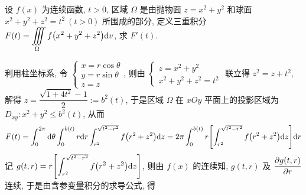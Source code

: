 \begin{example}
    设 $f(x)$ 为连续函数, $t>0$, 区域 $\Omega$ 是由抛物面 $z=x^2+y^2$ 和球面 $x^2+y^2+z^2=t^2~ (t>0)$ 所围成的部分, 定义三重积分 $\displaystyle F(t)=\iiint\limits_{\Omega}f\qty(x^2+y^2+z^2)\dd v$, 求 $F'(t).$
\end{example}
\begin{solution}
    利用柱坐标系, 令 $\begin{cases}
            x=r\cos\theta \\ y=r\sin\theta\\ z=z
        \end{cases}$, 则由 $\begin{cases}
            z=x^2+y^2 \\ x^2+y^2+z^2=t^2
        \end{cases}$ 联立得 $z^2=z+t^2$, 解得 $z=\dfrac{\sqrt{1+4t^2}-1}{2}:=b^2(t)$,
    于是区域 $\Omega$ 在 $xOy$ 平面上的投影区域为 $D_{xy}:x^2+y^2\leqslant b^2(t)$, 从而
    $$F(t)=\int_{0}^{2\pi}\dd \theta\int_{0}^{b(t)}r\dd r\int_{r^2}^{\sqrt{t^2-r^2}}f\qty(r^2+z^2)\dd z=2\pi\int_{0}^{b(t)}r\qty[\int_{r^2}^{\sqrt{t^2-r^2}}f\qty(r^2+z^2)\dd z]\dd r$$
    记 $\displaystyle g(t,r)=r\qty[\int_{r^2}^{\sqrt{t^2-r^2}}f\qty(r^2+z^2)\dd z]$, 则由 $f(x)$ 的连续知,  $g(t,r)$ 及 $\displaystyle\pdv{g(t,r)}{r}$ 连续,
    于是由含参变量积分的求导公式, 得
\end{solution}

